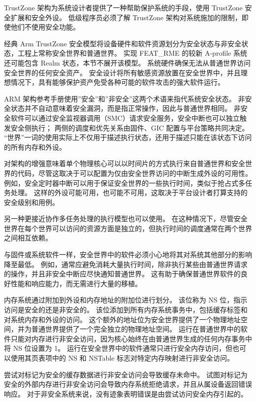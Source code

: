 TrustZone 架构为系统设计者提供了一种帮助保护系统的手段，使用 TrustZone 安全扩展和安全外设。
低级程序员必须了解 TrustZone 架构对系统施加的限制，即使他们不使用安全功能。

经典 Arm TrustZone 安全模型将设备硬件和软件资源划分为安全状态与非安全状态，工程上常称安全世界和普通世界。
实现 FEAT\_RME 的较新 A-profile 系统还可能包含 Realm 状态，本节不展开该模型。
系统硬件确保无法从普通世界访问安全世界的任何安全资产。
安全设计将所有敏感资源放置在安全世界中，并且理想情况下，具有能够保护资产免受各种可能的软件攻击的强大软件运行。

ARM 架构参考手册使用''安全''和''非安全''这两个术语来指代系统安全状态。
非安全状态并不自动意味着安全漏洞，而是指正常操作，因此与普通世界相同。
非安全软件可以通过安全监视器调用（SMC）请求安全服务，安全中断也可以独立触发安全侧执行；
两侧的调度和优先关系由固件、GIC 配置与平台策略共同决定。
``世界''一词的使用实际上不仅用于描述执行状态，还用于描述只能在该状态下访问的所有内存和外设。

对架构的增强意味着单个物理核心可以以时间片的方式执行来自普通世界和安全世界的代码，尽管这取决于可以配置为仅由安全世界访问的中断生成外设的可用性。
例如，安全定时器中断可以用于保证安全世界的一些执行时间，类似于抢占式多任务处理。
这样的外设可能可用，也可能不可用，这取决于平台设计者打算支持的安全级别和用例。

另一种更接近协作多任务处理的执行模型也可以使用。
在这种情况下，尽管安全世界在每个世界可以访问的资源方面是独立的，但执行时间的调度通常在两个世界之间相互依赖。

与固件或系统软件一样，安全世界中的软件必须小心地将其对系统其他部分的影响降至最低。
例如，通常应避免消耗大量执行时间，除非执行某些由普通世界请求的操作，并且非安全中断应尽快通知普通世界。
这有助于确保普通世界软件的良好性能和响应能力，而无需进行大量的移植。

内存系统通过附加到外设和内存地址的附加位进行划分。
该位称为 NS 位，指示访问是安全的还是非安全的。
该位添加到所有内存系统事务中，包括缓存标签和对系统内存和外设的访问。
这个额外的地址位为安全世界提供了一个物理地址空间，并为普通世界提供了一个完全独立的物理地址空间。
运行在普通世界中的软件只能对内存进行非安全访问，因为核心始终在由普通世界生成的任何内存事务中将 NS 位设置为 1。
运行在安全世界中的软件通常只进行安全内存访问，但也可以使用其页表项中的 NS 和 NSTable 标志对特定内存映射进行非安全访问。

尝试对标记为安全的缓存数据进行非安全访问会导致缓存未命中。
试图对标记为安全的外部内存进行非安全访问会导致内存系统拒绝请求，并且从属设备返回错误响应。
对于非安全系统来说，没有迹象表明错误是由尝试访问安全内存引起的。

